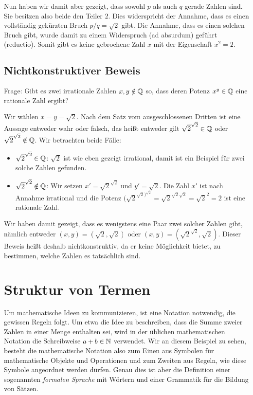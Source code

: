 Nun haben wir damit aber gezeigt, dass sowohl $p$ als auch $q$ gerade Zahlen sind. Sie besitzen also beide den Teiler $2$. Dies widerspricht der Annahme, dass es einen vollständig gekürzten Bruch $p / q = \sqrt{2}$ gibt. Die Annahme, dass es einen solchen Bruch gibt, wurde damit zu einem Widerspruch (ad absurdum) geführt (reductio). Somit gibt es keine gebrochene Zahl $x$ mit der Eigenschaft $x^2=2$.

\subsection{Nichtkonstruktiver Beweis}

Frage: Gibt es zwei irrationale Zahlen $x,y\notin \mathbb{Q}$ so, dass deren Potenz $x^y\in \mathbb{Q}$ eine rationale Zahl ergibt?

Wir wählen $x=y=\sqrt{2}$. Nach dem Satz vom ausgeschlossenen Dritten ist eine Aussage entweder wahr oder falsch, das heißt entweder gilt $\sqrt{2}^{\sqrt{2}} \in \mathbb{Q}$ oder $\sqrt{2}^{\sqrt{2}}\notin\mathbb{Q}$. Wir betrachten beide Fälle:

\begin{itemize}
	\item $\sqrt{2}^{\sqrt{2}}\in\mathbb{Q}$: $\sqrt{2}$ ist wie eben gezeigt irrational, damit ist ein Beispiel für zwei solche Zahlen gefunden.

	\item $\sqrt{2}^{\sqrt{2}}\notin\mathbb{Q}$: Wir setzen $x' = \sqrt{2}^{\sqrt{2}}$ und $y'=\sqrt{2}$. Die Zahl $x'$ ist nach Annahme irrational und die Potenz $(\sqrt{2}^{\sqrt{2})^{\sqrt{2}}} = \sqrt{2}^{\sqrt{2}\sqrt{2}} = \sqrt{2}^2 = 2$ ist eine rationale Zahl.
\end{itemize}

Wir haben damit gezeigt, dass es wenigstens eine Paar zwei solcher Zahlen gibt, nämlich entweder $(x,y) = (\sqrt{2}, \sqrt{2})$ oder $(x,y) = (\sqrt{2}^{\sqrt{2}}, \sqrt{2})$. Dieser Beweis heißt deshalb nichtkonstruktiv, da er keine Möglichkeit bietet, zu bestimmen, welche Zahlen es tatsächlich sind.

\section{Struktur von Termen}

Um mathematische Ideen zu kommunizieren, ist eine Notation notwendig, die gewissen Regeln folgt. Um etwa die Idee zu beschreiben, dass die Summe zweier Zahlen in einer Menge enthalten sei, wird in der üblichen mathematischen Notation die Schreibweise $a+b\in\mathbb{N}$ verwendet. Wir an diesem Beispiel zu sehen, besteht die mathematische Notation also zum Einen aus Symbolen für mathematische Objekte und Operationen und zum Zweiten aus Regeln, wie diese Symbole angeordnet werden dürfen. Genau dies ist aber die Definition einer sogenannten \emph{formalen Sprache} mit Wörtern und einer Grammatik für die Bildung von Sätzen.

